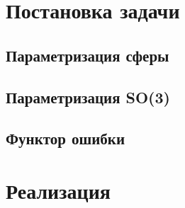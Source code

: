 \section{Постановка задачи}

\subsection{Параметризация сферы}

\subsection{Параметризация SO(3)}

\subsection{Функтор ошибки}

\section{Реализация}